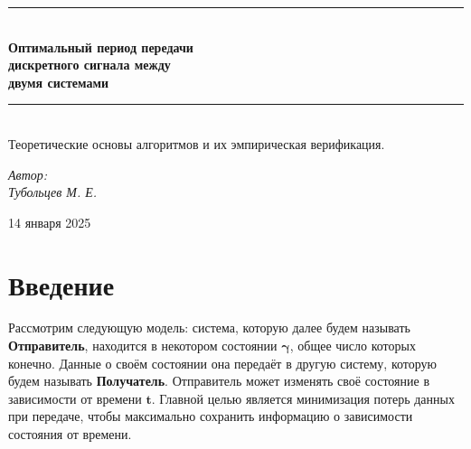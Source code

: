 \documentclass[12pt]{report}
\begin{document}
\begin{titlepage}

\vfill
\begin{center}

\rule{\linewidth}{0.5 mm} \\[0.1 cm]
{\huge \bfseries Оптимальный период передачи\\[0.01cm]

дискретного сигнала между\\[0.01cm]

двумя системами\\[0.01cm]
}
\rule{\linewidth}{0.5 mm}
\\[2.0 cm]

{\Large Теоретические основы алгоритмов и их эмпирическая верификация.}\\[5.0 cm]

    \begin{flushleft}
    \large \emph{Автор: \\Тубольцев М. Е.}
    \end{flushleft}

\vfill
14 января 2025

\end{center}
\end{titlepage}

\renewcommand{\abstractname}{\Large Аннотация}
\begin{abstract}
В статье рассматриваются методы минимизации погрешностей при дискретной передаче данных между системами. Задача оптимального выбора интервала передачи формализована с использованием аксиоматического подхода, учитывающего ограничения на точность и сохранение данных. На основе введённой аксиоматики были разработаны два алгоритма, применимость которых подтверждена эмпирическим исследованием. Обсуждаются также возможности адаптации методов для специфических случаев, включая квантовые системы, и предлагаются направления для дальнейших исследований.
\end{abstract}

\tableofcontents
\pagebreak
\renewcommand{\thesection}{\arabic{section}}

\section{Введение}
Рассмотрим следующую модель: система, которую далее будем называть \textbf{Отправитель}, находится в некотором состоянии $\bm{\gamma}$, общее число которых конечно. Данные о своём состоянии она передаёт в другую систему, которую будем называть \textbf{Получатель}. Отправитель может изменять своё состояние в зависимости от времени $\bm{t}$. Главной целью является минимизация потерь данных при передаче, чтобы максимально сохранить информацию о зависимости состояния от времени.
\end{document}
